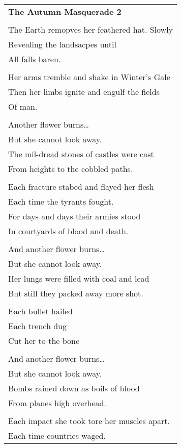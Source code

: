 \documentclass{article}
\begin{document}
\begin{center}
\begin{tabular}{l}
\textbf{The Autumn Masquerade 2} \\
\\
The Earth remopves her feathered hat. Slowly \\
Revealing the landsacpes until \\
All falls baren. \\
\\
Her arms tremble and shake in Winter's Gale \\
Then her limbs ignite and engulf the fields \\
Of man. \\
\\
Another flower burns\ldots{} \\
But she cannot look away. \\
The mil-dread stones of castles were cast \\
From heights to the cobbled paths. \\
\\
Each fracture stabed and flayed her flesh \\
Each time the tyrants fought. \\
For days and days their armies stood \\
In courtyards of blood and death. \\
\\
And another flower burns\ldots{} \\
But she cannot look away. \\
Her lungs were filled with coal and lead \\
But still they packed away more shot. \\
\\
Each bullet hailed \\
Each trench dug \\
Cut her to the bone \\
\\
And another flower burns\ldots{} \\
But she cannot look away. \\
Bombs rained down as boils of blood \\
From planes high overhead. \\
\\
Each impact she took tore her muscles apart. \\
Each time countries waged. \\
\end{tabular}
\end{center}
\end{document}
